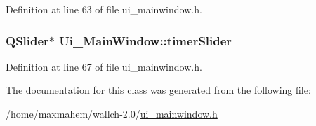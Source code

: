 Definition at line 63 of file ui\_\-mainwindow.h.

\hypertarget{classUi__MainWindow_aed2eea321894fe7a8f3e23b78fc42793}{
\subsubsection[{timerSlider}]{\setlength{\rightskip}{0pt plus 5cm}QSlider$\ast$ {\bf Ui\_\-MainWindow::timerSlider}}}
\label{classUi__MainWindow_aed2eea321894fe7a8f3e23b78fc42793}


Definition at line 67 of file ui\_\-mainwindow.h.



The documentation for this class was generated from the following file:\begin{DoxyCompactItemize}
\item 
/home/maxmahem/wallch-\/2.0/\hyperlink{ui__mainwindow_8h}{ui\_\-mainwindow.h}\end{DoxyCompactItemize}
